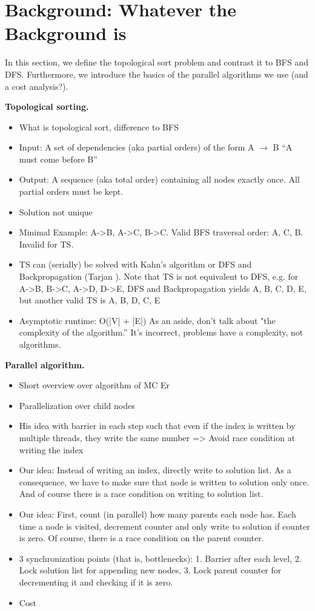 \documentclass[letterpaper]{article}
\newcommand{\mypar}[1]{{\bf #1.}}
\begin{document}
\section{Background: Whatever the Background is}\label{sec:background}

 In this section, we define the topological sort problem and contrast it to BFS and DFS.
 Furthermore, we introduce the basics of the parallel algorithms we use (and a cost analysis?).
 
 \begin{invisible}
 \mypar{Topological sorting}
 \begin{itemize}
  \item What is topological sort, difference to BFS
  \item Input: A set of dependencies (aka partial orders) of the form A $\rightarrow$ B ``A must come before B''
  \item Output: A sequence (aka total order) containing all nodes exactly once. All partial orders must be kept.
  \item Solution not unique
  \item Minimal Example: A->B, A->C, B->C. Valid BFS traversal order: A, C, B. Invalid for TS.
  \item TS can (serially) be solved with Kahn's algorithm \cite{kahn1962topological} or DFS and Backpropagation (Tarjan \cite{tarjan1976edge}). %
        Note that TS is not equivalent to DFS, e.g. for A->B, B->C, A->D, D->E, DFS and Backpropagation yields A, B, C, D, E, but another valid TS is A, B, D, C, E
  \item Asymptotic runtime: O(|V| + |E|)
As an aside, don't talk about "the complexity of the algorithm.'' It's incorrect,
problems have a complexity, not algorithms.  
 \end{itemize}

 \mypar{Parallel algorithm}
 \begin{itemize}
  \item Short overview over algorithm of MC Er
  \item Parallelization over child nodes
  \item His idea with barrier in each step such that even if the index is written by multiple threads, they write the same number => Avoid race condition at writing the index
  \item Our idea: Instead of writing an index, directly write to solution list. As a consequence, we have to make sure that node is written to solution only once. And of course there is a race condition on writing to solution list.
  \item Our idea: First, count (in parallel) how many parents each node has. Each time a node is visited, decrement counter and only write to solution if counter is zero. Of course, there is a race condition on the parent counter.
  \item 3 synchronization points (that is, bottlenecks): 1. Barrier after each level, 2. Lock solution list for appending new nodes, 3. Lock parent counter for decrementing it and checking if it is zero.
  \item Cost
 \end{itemize}


\end{invisible}
\end{document}
